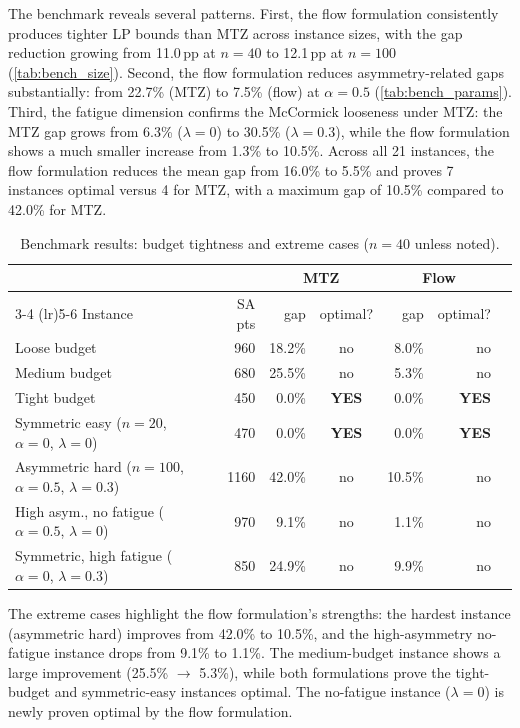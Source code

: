 \documentclass[preprint,11pt]{elsarticle}
\begin{document}
The benchmark reveals several patterns.
First, the flow formulation consistently produces tighter LP bounds than MTZ across instance sizes, with the gap reduction growing from 11.0\,pp at $n = 40$ to 12.1\,pp at $n = 100$ (\cref{tab:bench_size}).
Second, the flow formulation reduces asymmetry-related gaps substantially: from 22.7\% (MTZ) to 7.5\% (flow) at $\alpha = 0.5$ (\cref{tab:bench_params}).
Third, the fatigue dimension confirms the McCormick looseness under MTZ: the MTZ gap grows from 6.3\% ($\lambda = 0$) to 30.5\% ($\lambda = 0.3$), while the flow formulation shows a much smaller increase from 1.3\% to 10.5\%.
Across all 21 instances, the flow formulation reduces the mean gap from 16.0\% to 5.5\% and proves 7 instances optimal versus 4 for MTZ, with a maximum gap of 10.5\% compared to 42.0\% for MTZ.

\begin{table}[H]
\centering
\caption{Benchmark results: budget tightness and extreme cases ($n = 40$ unless noted).}
\label{tab:bench_extra}
\begin{tabular}{lrrcrrc}
\toprule
& & \multicolumn{2}{c}{\textbf{MTZ}} & \multicolumn{2}{c}{\textbf{Flow}} \\
\cmidrule(lr){3-4} \cmidrule(lr){5-6}
Instance & SA pts & gap & optimal? & gap & optimal? \\
\midrule
Loose budget          & 960  & 18.2\% & no  &  8.0\% & no \\
Medium budget         & 680  & 25.5\% & no  &  5.3\% & no \\
Tight budget          & 450  &  0.0\% & \textbf{YES} &  0.0\% & \textbf{YES} \\
Symmetric easy ($n{=}20$, $\alpha{=}0$, $\lambda{=}0$) & 470 & 0.0\% & \textbf{YES} & 0.0\% & \textbf{YES} \\
Asymmetric hard ($n{=}100$, $\alpha{=}0.5$, $\lambda{=}0.3$) & 1160 & 42.0\% & no & 10.5\% & no \\
High asym., no fatigue ($\alpha{=}0.5$, $\lambda{=}0$) & 970 & 9.1\% & no & 1.1\% & no \\
Symmetric, high fatigue ($\alpha{=}0$, $\lambda{=}0.3$) & 850 & 24.9\% & no & 9.9\% & no \\
\bottomrule
\end{tabular}
\end{table}

The extreme cases highlight the flow formulation's strengths: the hardest instance (asymmetric hard) improves from 42.0\% to 10.5\%, and the high-asymmetry no-fatigue instance drops from 9.1\% to 1.1\%.
The medium-budget instance shows a large improvement (25.5\% $\to$ 5.3\%), while both formulations prove the tight-budget and symmetric-easy instances optimal.
The no-fatigue instance ($\lambda = 0$) is newly proven optimal by the flow formulation.
\end{document}
